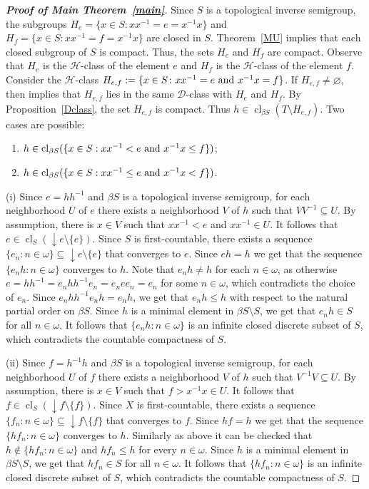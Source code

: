 \documentclass[12pt, twoside, leqno]{article}
\theoremstyle{definition}
\numberwithin{equation}{section}
\newcommand{\w}{\omega}
\newcommand{\cl}{\operatorname{cl}}
\begin{document}
\begin{proof}[{\bf Proof of Main Theorem~\ref{main}}]
Since $S$ is a topological inverse semigroup, the subgroups $H_e=\{x\in S\colon xx^{-1}=e=x^{-1}x\}$ and $H_f=\{x\in S\colon xx^{-1}=f=x^{-1}x\}$ are closed in $S$. Theorem~\ref{MU} implies that each closed subgroup of $S$ is compact. Thus, the sets $H_e$ and $H_f$ are compact. Observe that $H_e$ is the $\mathcal H$-class of the element $e$ and $H_f$ is the $\mathcal H$-class of the element $f$. 
Consider the $\mathcal H$-class $H_{e,f}:=\{x\in S\colon xx^{-1}=e \hbox{ and }x^{-1}x=f\}$. If $H_{e,f}\neq \varnothing$, then \cite[Proposition 5]{Lawson} implies that $H_{e,f}$ lies in the same $\mathcal D$-class with $H_e$ and $H_f$.  By Proposition~\ref{Dclass}, the set  $H_{e,f}$ is compact. Thus $h\in \cl_{\beta S}(T\setminus H_{e,f})$. Two cases are possible:
\begin{enumerate}[label=(\roman*)]
    \item $h\in \cl_{\beta S}(\{x\in S: xx^{-1}<e\hbox{ and }x^{-1}x\leq f\})$;
       \item $h\in \cl_{\beta S}(\{x\in S: xx^{-1}\leq e\hbox{ and }x^{-1}x< f\})$. 
\end{enumerate}

(i) Since $e=hh^{-1}$ and $\beta S$ is a topological inverse semigroup, for each neighborhood $U$ of $e$ there exists a neighborhood $V$ of $h$ such that $VV^{-1}\subseteq U$. By assumption, there is $x\in V$ such that $xx^{-1}<e$ and $xx^{-1}\in U$. It follows that $e\in \cl_S({\downarrow}e\setminus\{e\})$. Since $S$ is first-countable, there exists a sequence $\{e_n:n\in\w\}\subseteq {\downarrow}e\setminus\{e\}$ that converges to $e$. Since $eh=h$ we get that the sequence $\{e_nh:n\in\w\}$ converges to $h$. Note that $e_nh\neq h$ for each $n\in\w$, as otherwise $e=hh^{-1}=e_nhh^{-1}e_n=e_nee_n=e_n$ for some $n\in\w$, which contradicts the choice of $e_n$. Since $e_nhh^{-1}e_nh=e_nh$, we get that $e_nh\leq h$ with respect to the natural partial order on $\beta S$. Since $h$ is a minimal element in $\beta S\setminus S$, we get that $e_nh\in S$ for all $n\in\w$. It follows that $\{e_nh:n\in\w\}$ is an infinite closed discrete subset of $S$, which contradicts the countable compactness of $S$. 


(ii) Since $f=h^{-1}h$ and $\beta S$ is a topological inverse semigroup, for each neighborhood $U$ of $f$ there exists a neighborhood $V$ of $h$ such that $V^{-1}V\subseteq U$. By assumption, there is $x\in V$ such that $f>x^{-1}x\in U$. It follows that $f\in \cl_S({\downarrow}f\setminus\{f\})$. Since $X$ is first-countable, there exists a sequence $\{f_n:n\in\w\}\subseteq {\downarrow}f\setminus\{f\}$ that converges to $f$. Since $hf=h$ we get that the sequence $\{hf_n:n\in\w\}$ converges to $h$. Similarly as above it can be checked that $h\notin\{hf_n:n\in\w\}$ and $hf_n\leq h$ for every $n\in\w$. Since $h$ is a minimal element in $\beta S\setminus S$, we get that $hf_n\in S$ for all $n\in\w$. It follows that $\{hf_n:n\in\w\}$ is an infinite  closed discrete subset of $S$, which contradicts the countable compactness of $S$. 


\end{proof}
\end{document}
